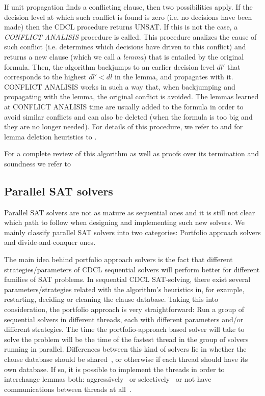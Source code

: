\documentclass{llncs}
\begin{document}
If unit propagation finds a conflicting clause, then two possibilities apply. If the decision level
at which such conflict is found is zero (i.e. no decisions have been made) then the CDCL procedure
returns UNSAT. If this is not the case, a \emph{CONFLICT ANALISIS}
 procedure is called. This procedure analizes the cause of such conflict (i.e. determines which 
decisions have driven to this conflict) and returns a new clause (which we call a \emph{lemma}) 
that is entailed by the original formula. Then, the algorithm backjumps to an earlier 
decision level $dl'$ that corresponds to the highest $dl'<dl$ in the lemma, and propagates with it.
CONFLICT ANALISIS works in such a way that, when backjumping and propagating with the lemma, the 
original conflict is avoided. The lemmas learned at CONFLICT ANALISIS time are usually added to 
the formula in order to avoid similar conflicts and can also be deleted 
(when the formula is too big and they are no longer needed). For details of this procedure, we
refer to \cite{GRASP1999IEEE,Zhang2001} and for lemma deletion heuristics to \cite{Relsat97,Goldberg2002DATE,gluclose}.

For a complete review of this algorithm as well as proofs over its
termination and soundness we refer to \cite{Nieuwenhuisetal2006JACM}


\subsection{Parallel SAT solvers}
Parallel SAT solvers are not as mature 
as sequential ones and it is still not clear which path to follow
when designing and implementing such new solvers.  
We mainly classify parallel SAT solvers into two categories: 
Portfolio approach solvers and divide-and-conquer ones.

The main idea behind portfolio approach solvers is the fact that different 
strategies/parameters of CDCL sequential solvers will perform better 
for different families of SAT problems. 
In sequential CDCL SAT-solving, there exist several parameters/strategies 
related with the algorithm's heuristics in, for example, restarting, deciding 
or cleaning the clause database. Taking this into 
consideration, the portfolio approach is very straightforward: 
Run a group of sequential solvers in different threads, 
each with different parameters
 and/or different strategies. The time the portfolio-approach based 
solver will take to solve the problem will be the time of the fastest 
thread in the group of solvers running in parallel. 
Differences between this kind of solvers lie in whether the clause
database should be shared~\cite{Sartagnan}, or otherwise if each thread should 
have its own database. If so, it is possible to implement the threads in order to
interchange lemmas both: aggressively~\cite{ManySAT} or selectively~\cite{plingeling} or 
not have communications between threads at all~\cite{ppfolio}.
\end{document}
